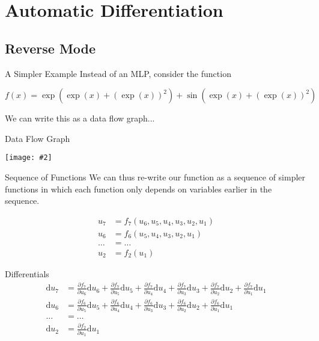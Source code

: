 \documentclass{beamer}
\newcommand {\framedgraphic}[2] {
    \begin{frame}{#1}
        \begin{center}
            \texttt{[image: \#2]}
        \end{center}
    \end{frame}
}
\begin{document}
\section{Automatic Differentiation}

\subsection{Reverse Mode}

\begin{frame}[fragile]{A Simpler Example}
Instead of an MLP, consider the function

$$
f(x) = \exp(\exp(x) + (\exp(x))^2) + \sin(\exp(x) + (\exp(x))^2)
$$

We can write this as a data flow graph...
\end{frame}

\framedgraphic{Data Flow Graph}{diagrams/02c0671aa558b88e5ed6f195b22bbd8a.png}

\begin{frame}[fragile]{Sequence of Functions}
We can thus re-write our function as a sequence of simpler functions
in which each function only depends on variables earlier in the
sequence.

$$
\begin{aligned}
u_7    &= f_7(u_6, u_5, u_4, u_3, u_2, u_1) \\
u_6    &= f_6(u_5, u_4, u_3, u_2, u_1) \\
\ldots &= \ldots \\
u_2    &= f_2(u_1)
\end{aligned}
$$
\end{frame}

\begin{frame}[fragile]{Differentials}
$$
\begin{aligned}
\mathrm{d}u_7    &= \frac{\partial f_7}{\partial u_6} \mathrm{d} u_6 +
                    \frac{\partial f_7}{\partial u_5} \mathrm{d} u_5 +
                    \frac{\partial f_7}{\partial u_4} \mathrm{d} u_4 +
                    \frac{\partial f_7}{\partial u_3} \mathrm{d} u_3 +
                    \frac{\partial f_7}{\partial u_2} \mathrm{d} u_2 +
                    \frac{\partial f_7}{\partial u_1} \mathrm{d} u_1 \\
\mathrm{d}u_6    &= \frac{\partial f_6}{\partial u_5} \mathrm{d} u_5 +
                    \frac{\partial f_6}{\partial u_4} \mathrm{d} u_4 +
                    \frac{\partial f_6}{\partial u_3} \mathrm{d} u_3 +
                    \frac{\partial f_6}{\partial u_2} \mathrm{d} u_2 +
                    \frac{\partial f_6}{\partial u_1} \mathrm{d} u_1 \\
\ldots           &= \ldots \\
\mathrm{d}u_2    &= \frac{\partial f_2}{\partial u_1} \mathrm{d} u_1
\end{aligned}
$$
\end{frame}
\end{document}
